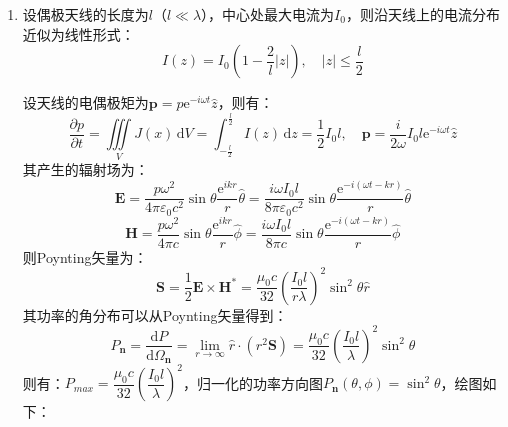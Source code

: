 \documentclass[a4paper]{article}
\renewcommand\epsilon\varepsilon
\renewcommand\bm\symbf
\begin{document}
\begin{enumerate}
    \bigskip
    \item[2.]
    设偶极天线的长度为$l$（$l\ll\lambda$），中心处最大电流为$I_0$，则沿天线上的电流分布近似为线性形式：
    \[
        I(z) = I_0(1-\frac{2}{l}|z|),\quad |z|\leqslant\frac{l}{2}
    \]
    \begin{center}
    \end{center}
    设天线的电偶极矩为$\bm{p}=p\mathrm{e}^{-i\omega t}\hat{z}$，则有：
    \[
        \frac{\partial p}{\partial t} = \iiint\limits_V J(x)\,\mathrm{d}V = \int_{-\tfrac{l}{2}}^{\tfrac{l}{2}} I(z)\,\mathrm{d}z = \frac{1}{2}I_0l,\quad
        \bm{p}=\frac{i}{2\omega}I_0l\mathrm{e}^{-i\omega t}\hat{z}
    \]
    其产生的辐射场为：
    \[
        \bm{E}
        = \frac{p\omega^2}{4\pi\epsilon_0c^2}\sin\theta\frac{\mathrm{e}^{ikr}}{r}\hat{\theta}
        = \frac{i\omega I_0l}{8\pi\epsilon_0c^2}\sin\theta\frac{\mathrm{e}^{-i(\omega t-kr)}}{r}\hat{\theta}
    \]
    \[
        \bm{H}
        = \frac{p\omega^2}{4\pi c}\sin\theta\frac{\mathrm{e}^{ikr}}{r}\hat{\phi}
        = \frac{i\omega I_0l}{8\pi c}\sin\theta\frac{\mathrm{e}^{-i(\omega t-kr)}}{r}\hat{\phi}
    \]
    则Poynting矢量为：
    \[
        \bm{S}
        = \frac{1}{2}\bm{E}\times\bm{H}^*
        = \frac{\mu_0c}{32}\left(\frac{I_0l}{r\lambda}\right)^2\sin^2\theta\hat{r}
    \]
    其功率的角分布可以从Poynting矢量得到：
    \[
        P_{\bm{n}}
        = \frac{\mathrm{d}P}{\mathrm{d}\Omega_{\bm{n}}}
        = \lim_{r\to\infty} \hat{r}\cdot(r^2\bm{S})
        = \frac{\mu_0c}{32}\left(\frac{I_0l}{\lambda}\right)^2\sin^2\theta
    \]
    则有：$P_{max}=\dfrac{\mu_0c}{32}\left(\dfrac{I_0l}{\lambda}\right)^2$，归一化的功率方向图$P_{\bm{n}}(\theta,\phi)=\sin^2\theta$，绘图如下：
    \begin{center}
\end{center}
\end{enumerate}
\end{document}
